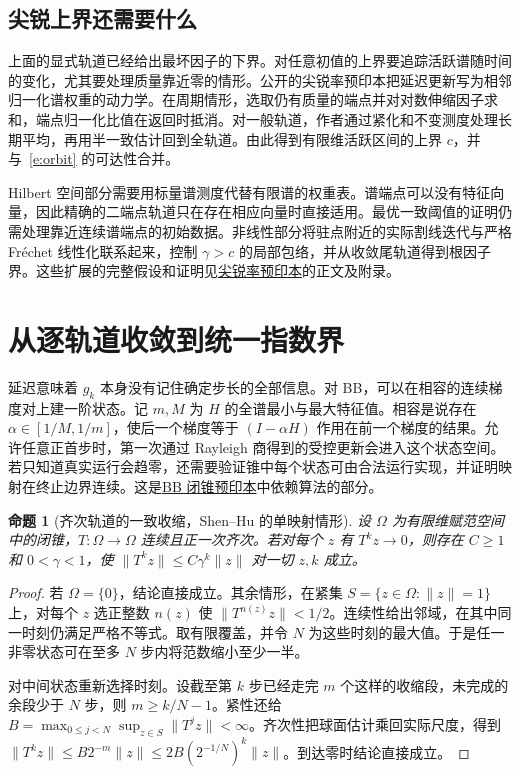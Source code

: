 \documentclass[UTF8,zihao=-4,a4paper]{ctexart}
\newtheorem{proposition}{命题}
\newcommand{\norm}[1]{\lVert #1\rVert}
\begin{document}
\subsection{尖锐上界还需要什么}

上面的显式轨道已经给出最坏因子的下界。对任意初值的上界要追踪活跃谱随时间的变化，尤其要处理质量靠近零的情形。公开的尖锐率预印本把延迟更新写为相邻归一化谱权重的动力学。在周期情形，选取仍有质量的端点并对对数伸缩因子求和，端点归一化比值在返回时抵消。对一般轨道，作者通过紧化和不变测度处理长期平均，再用半一致估计回到全轨道。由此得到有限维活跃区间的上界 $c$，并与~\eqref{e:orbit} 的可达性合并。

Hilbert 空间部分需要用标量谱测度代替有限谱的权重表。谱端点可以没有特征向量，因此精确的二端点轨道只在存在相应向量时直接适用。最优一致阈值的证明仍需处理靠近连续谱端点的初始数据。非线性部分将驻点附近的实际割线迭代与严格 Fréchet 线性化联系起来，控制 $\gamma>c$ 的局部包络，并从收敛尾轨道得到根因子界。这些扩展的完整假设和证明见\href{https://arxiv.org/abs/2608.07839}{尖锐率预印本}的正文及附录。

\section{从逐轨道收敛到统一指数界}

延迟意味着 $g_k$ 本身没有记住确定步长的全部信息。对 BB，可以在相容的连续梯度对上建一阶状态。记 $m,M$ 为 $H$ 的全谱最小与最大特征值。相容是说存在 $\alpha\in[1/M,1/m]$，使后一个梯度等于 $(I-\alpha H)$ 作用在前一个梯度的结果。允许任意正首步时，第一次通过 Rayleigh 商得到的受控更新会进入这个状态空间。若只知道真实运行会趋零，还需要验证锥中每个状态可由合法运行实现，并证明映射在终止边界连续。这是\href{https://arxiv.org/abs/2609.12100}{BB 闭锥预印本}中依赖算法的部分。

\begin{proposition}[齐次轨道的一致收缩，Shen--Hu 的单映射情形]
设 $\Omega$ 为有限维赋范空间中的闭锥，$T:\Omega\to\Omega$ 连续且正一次齐次。若对每个 $z$ 有 $T^kz\to0$，则存在 $C\ge1$ 和 $0<\gamma<1$，使 $\norm{T^kz}\le C\gamma^k\norm z$ 对一切 $z,k$ 成立。
\end{proposition}
\begin{proof}
若 $\Omega=\{0\}$，结论直接成立。其余情形，在紧集 $S=\{z\in\Omega:\norm z=1\}$ 上，对每个 $z$ 选正整数 $n(z)$ 使 $\norm{T^{n(z)}z}<1/2$。连续性给出邻域，在其中同一时刻仍满足严格不等式。取有限覆盖，并令 $N$ 为这些时刻的最大值。于是任一非零状态可在至多 $N$ 步内将范数缩小至少一半。

对中间状态重新选择时刻。设截至第 $k$ 步已经走完 $m$ 个这样的收缩段，未完成的余段少于 $N$ 步，则 $m\ge k/N-1$。紧性还给
$B=\max_{0\le j<N}\sup_{z\in S}\norm{T^jz}<\infty$。齐次性把球面估计乘回实际尺度，得到
$\norm{T^kz}\le B2^{-m}\norm z \le 2B(2^{-1/N})^k\norm z$。到达零时结论直接成立。
\end{proof}
\end{document}

